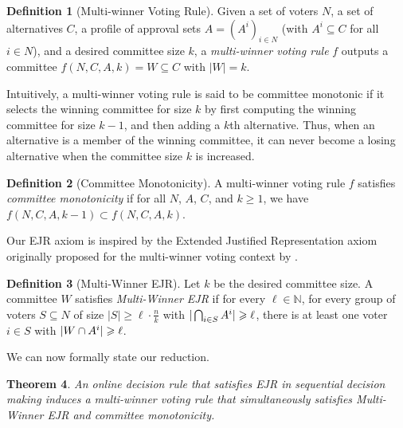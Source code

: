 \documentclass[10pt]{scrartcl}
\theoremstyle{plain}
\newtheorem{theorem}{Theorem}[section]
\theoremstyle{definition}
\newtheorem{definition}[theorem]{Definition}
\renewcommand*{\ge}{\geqslant}
\renewcommand*{\geq}{\geqslant}
\begin{document}
\begin{definition}[Multi-winner Voting Rule] 
Given a set of voters $N$, a set of alternatives $C$, a profile of approval sets $A = (A^i)_{i\in N}$ (with $A^i \subseteq C$ for all $i \in N$), and a desired committee size $k$, a \emph{multi-winner voting rule} $f$ outputs a committee $f(N, C, A, k) = W \subseteq C$ with $|W| = k$.
\end{definition}

Intuitively, a multi-winner voting rule is said to be committee monotonic if it selects the winning committee for size $k$ by first computing the winning committee for size $k-1$, and then adding a $k$th alternative. Thus, when an alternative is a member of the winning committee, it can never become a losing alternative when the committee size $k$ is increased.

\begin{definition}[Committee Monotonicity] 
A multi-winner voting rule $f$ satisfies \emph{committee monotonicity} if for all $N$, $A$, $C$, and $k \ge 1$, we have $f(N, C, A, k-1) \subset f(N, C, A, k)$.
\end{definition}

Our EJR axiom is inspired by the Extended Justified Representation axiom originally proposed for the multi-winner voting context by \citet{ejr}.

\begin{definition}[Multi-Winner EJR] 
Let $k$ be the desired committee size. A committee $W$ satisfies \emph{Multi-Winner EJR} if for every $\ell \in \mathbb{N}$, for every group of voters $S \subseteq N$ of size $|S| \geq \ell \cdot \frac{n}{k}$ with $\smash{|\bigcap_{i\in S} A^i|} \ge \ell$, there is at least one voter $i \in S$ with $\smash{|W \cap A^i|} \ge \ell$.
\end{definition}

We can now formally state our reduction.

\begin{theorem}
    An online decision rule that satisfies EJR in sequential decision making induces a multi-winner voting rule that simultaneously satisfies Multi-Winner EJR and committee monotonicity. 
\end{theorem}
\end{document}
